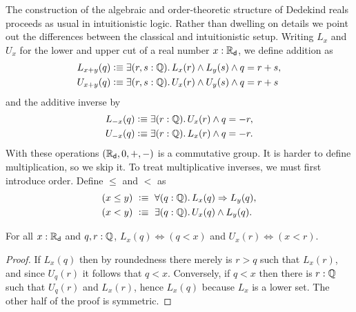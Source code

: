 The construction of the algebraic and order-theoretic structure of Dedekind reals proceeds
as usual in intuitionistic logic. Rather than dwelling on details we point out the
differences between the classical and intuitionistic setup. Writing $L_x$ and $U_x$ for
the lower and upper cut of a real number $x : \mathbb{R}_\mathsf{d}$, we define addition as%
%
\begin{align*}
  L_{x + y}(q) &\defeq \exis{r, s : \Q} L_x(r) \land L_y(s) \land q = r + s, \\
  U_{x + y}(q) &\defeq \exis{r, s : \Q} U_x(r) \land U_y(s) \land q = r + s
\end{align*}
%
and the additive inverse by
%
\begin{align*}
  L_{-x}(q) &\defeq \exis{r : \Q} U_x(r) \land q = - r, \\
  U_{-x}(q) &\defeq \exis{r : \Q} L_x(r) \land q = - r.
\end{align*}
%
With these operations $(\mathbb{R}_\mathsf{d}, 0, {+}, {-})$ is a commutative group. It is harder to define
multiplication, so we skip it. To treat multiplicative inverses, we must first introduce
order. Define $\leq$ and $<$ as
%
\begin{align*}
  (x \leq y) &\ \defeq \ \fall{q : \Q} L_x(q) \Rightarrow L_y(q), \\
  (x < y)    &\ \defeq \ \exis{q : \Q} U_x(q) \land L_y(q).
\end{align*}

\begin{lem} \label{dedekind-in-cut-as-le}
  For all $x : \mathbb{R}_\mathsf{d}$ and $q, r : \mathbb{Q}$, $L_x(q) \Leftrightarrow (q < x)$ and $U_x(r)
  \Leftrightarrow (x < r)$.
\end{lem}

\begin{proof}
  If $L_x(q)$ then by roundedness there merely is $r > q$ such that $L_x(r)$, and since
  $U_q(r)$ it follows that $q < x$. Conversely, if $q < x$ then there is $r : \mathbb{Q}$ such
  that $U_q(r)$ and $L_x(r)$, hence $L_x(q)$ because $L_x$ is a lower set. The other half
  of the proof is symmetric.
\end{proof}

